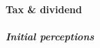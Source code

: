 \documentclass[12pt]{article} %
\begin{document}



\paragraph{Tax \& dividend}

\subparagraph{Initial perceptions}
\end{document}
